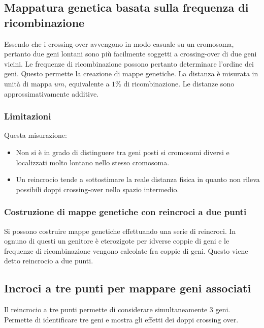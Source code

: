 	\subsection{Mappatura genetica basata sulla frequenza di ricombinazione}
	Essendo che i crossing-over avvengono in modo casuale su un cromosoma, pertanto due geni lontani sono pi\`u facilmente soggetti a crossing-over di due geni vicini.
	Le frequenze di ricombinazione possono pertanto determinare l'ordine dei geni.
	Questo permette la creazione di mappe genetiche.
	La distanza \`e misurata in unit\`a di mappa $um$, equivalente a $1\%$ di ricombinazione.
	Le distanze sono approssimativamente additive.
		
		\subsubsection{Limitazioni}
		Questa misurazione:
		\begin{multicols}{2}
			\begin{itemize}
				\item Non si \`e in grado di distinguere tra geni posti si cromosomi diversi e localizzati molto lontano nello stesso cromosoma.
				\item Un reincrocio tende a sottostimare la reale distanza fisica in quanto non rileva possibili doppi crossing-over nello spazio intermedio.
			\end{itemize}
		\end{multicols}

		\subsubsection{Costruzione di mappe genetiche con reincroci a due punti}
		Si possono costruire mappe genetiche effettuando una serie di reincroci.
		In ognuno di questi un genitore \`e eterozigote per idverse coppie di geni e le frequenze di ricombinazione vengono calcolate fra coppie di geni.
		Questo viene detto reincrocio a due punti.

	\subsection{Incroci a tre punti per mappare geni associati}
	Il reincrocio a tre punti permette di considerare simultaneamente $3$ geni.
	Permette di identificare tre geni e mostra gli effetti dei doppi crossing over.


